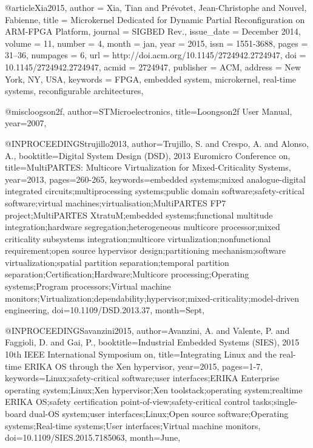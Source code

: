 @article{Xia2015,
 author = {Xia, Tian and Pr{\'e}votet, Jean-Christophe and Nouvel, Fabienne},
 title = {Microkernel Dedicated for Dynamic Partial Reconfiguration on ARM-FPGA Platform},
 journal = {SIGBED Rev.},
 issue_date = {December 2014},
 volume = {11},
 number = {4},
 month = jan,
 year = {2015},
 issn = {1551-3688},
 pages = {31--36},
 numpages = {6},
 url = {http://doi.acm.org/10.1145/2724942.2724947},
 doi = {10.1145/2724942.2724947},
 acmid = {2724947},
 publisher = {ACM},
 address = {New York, NY, USA},
 keywords = {FPGA, embedded system, microkernel, real-time systems, reconfigurable architectures},
} 

@misc{loogson2f,
	author={{STMicroelectronics}},
	title={Loongson2f User Manual},
	year={2007},
}

@INPROCEEDINGS{trujillo2013, 
author={Trujillo, S. and Crespo, A. and Alonso, A.}, 
booktitle={Digital System Design (DSD), 2013 Euromicro Conference on}, 
title={MultiPARTES: Multicore Virtualization for Mixed-Criticality Systems}, 
year={2013}, 
pages={260-265}, 
keywords={embedded systems;mixed analogue-digital integrated circuits;multiprocessing systems;public domain software;safety-critical software;virtual machines;virtualisation;MultiPARTES FP7 project;MultiPARTES XtratuM;embedded systems;functional multitude integration;hardware segregation;heterogeneous multicore processor;mixed criticality subsystems integration;multicore virtualization;nonfunctional requirement;open source hypervisor design;partitioning mechanism;software virtualization;spatial partition separation;temporal partition separation;Certification;Hardware;Multicore processing;Operating systems;Program processors;Virtual machine monitors;Virtualization;dependability;hypervisor;mixed-criticality;model-driven engineering}, 
doi={10.1109/DSD.2013.37}, 
month={Sept},}

@INPROCEEDINGS{avanzini2015, 
author={Avanzini, A. and Valente, P. and Faggioli, D. and Gai, P.}, 
booktitle={Industrial Embedded Systems (SIES), 2015 10th IEEE International Symposium on}, 
title={Integrating Linux and the real-time ERIKA OS through the Xen hypervisor}, 
year={2015}, 
pages={1-7}, 
keywords={Linux;safety-critical software;user interfaces;ERIKA Enterprise operating system;Linux;Xen hypervisor;Xen toolstack;operating system;realtime ERIKA OS;safety certification point-of-view;safety-critical control tasks;single-board dual-OS system;user interfaces;Linux;Open source software;Operating systems;Real-time systems;User interfaces;Virtual machine monitors}, 
doi={10.1109/SIES.2015.7185063}, 
month={June},}


